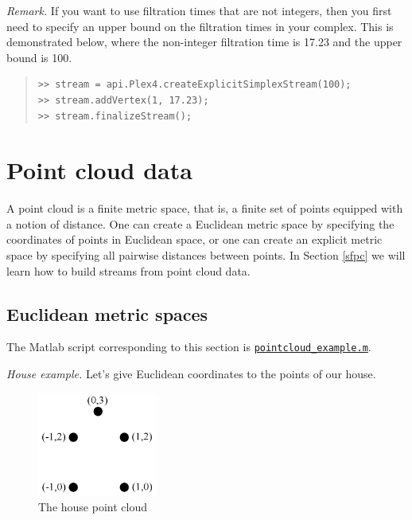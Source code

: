 \documentclass[amscd, amssymb, verbatim]{amsart}[12pt]
\theoremstyle{remark}
\theoremstyle{remark}
\theoremstyle{remark}
\begin{document}
{\em Remark.} If you want to use filtration times that are not integers, then you first need to specify an upper bound on the filtration times in your complex. This is demonstrated below, where the non-integer filtration time is 17.23 and the upper bound is 100.

\begin{quote} \begin{verbatim}
>> stream = api.Plex4.createExplicitSimplexStream(100);
>> stream.addVertex(1, 17.23);
>> stream.finalizeStream();
\end{verbatim} \end{quote}






\section{Point cloud data}

A point cloud is a finite metric space, that is, a finite set of points equipped with a notion of distance. One can create a Euclidean metric space by specifying the coordinates of points in Euclidean space, or one can create an explicit metric space by specifying all pairwise distances between points. In Section \ref{sfpc} we will learn how to build streams from point cloud data. 


\subsection{Euclidean metric spaces}\label{euc} The Matlab script corresponding to this section is \href{https://github.com/appliedtopology/javaplex/tree/master/src/matlab/for_distribution/tutorial_examples/pointcloud_example.m}{\texttt{pointcloud\_example.m}}. 

{\em House example.} Let's give Euclidean coordinates to the points of our house.

\vspace{-3mm}
\begin{figure}[htb]
	\centering
	\includegraphics[width=1.55in]{houseCoord.pdf}
	\vspace{-3mm}
	\caption{The house point cloud}
	\label{fig:housePointCloud}
\end{figure}
\FloatBarrier
\end{document}
